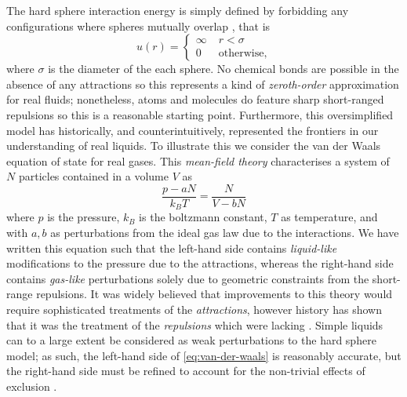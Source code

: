 \documentclass[11pt,twoside]{report}
\begin{document}
The hard sphere interaction energy is simply defined by forbidding any configurations where spheres mutually overlap%
,
that is
\begin{equation}\label{eq:hs-interaction}
  u(r) =
  \begin{cases}
    \infty & \; r < \sigma \\
    0 & \; \textrm{otherwise},
  \end{cases}
\end{equation}
where $\sigma$ is the diameter of the each sphere.
No chemical bonds are possible in the absence of any attractions so this represents a kind of \emph{zeroth-order} approximation for real fluids; nonetheless, atoms and molecules do feature sharp short-ranged repulsions so this is a reasonable starting point.
Furthermore, this oversimplified model has historically, and counterintuitively, represented the frontiers in our understanding of real liquids.
To illustrate this we consider the van der Waals equation of state for real gases.
This \emph{mean-field theory} characterises a system of $N$ particles contained in a volume $V$ as
\begin{equation}\label{eq:van-der-waals}
  \frac{p - a N}{k_B T} = \frac{N}{V - b N}
\end{equation}
where $p$ is the pressure, $k_B$ is the boltzmann constant, $T$ as temperature, and with $a,b$ as perturbations from the ideal gas law due to the interactions.
We have written this equation such that the left-hand side contains \emph{liquid-like} modifications to the pressure due to the attractions, whereas the right-hand side contains \emph{gas-like} perturbations solely due to geometric constraints from the short-range repulsions.
It was widely believed that improvements to this theory would require sophisticated treatments of the \emph{attractions}, however history has shown that it was the treatment of the \emph{repulsions} which were lacking \cite{Santos2016}.
Simple liquids can to a large extent be considered as weak perturbations to the hard sphere model; as such, the left-hand side of \eqref{eq:van-der-waals} is reasonably accurate, but the right-hand side must be refined to account for the non-trivial effects of exclusion \cite{Hansen2013}.

\end{document}

